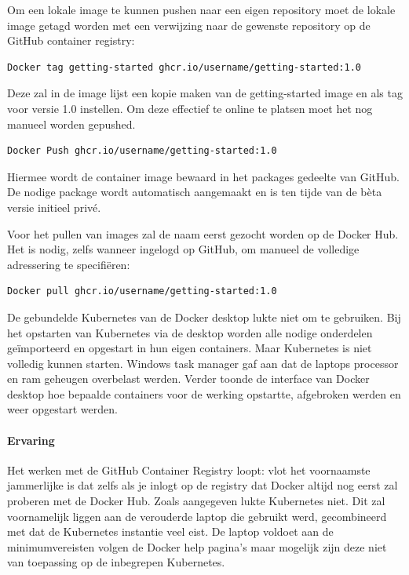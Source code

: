 Om een lokale image te kunnen pushen naar een eigen repository moet de lokale image getagd worden met een verwijzing naar de gewenste repository op de GitHub container registry:
\begin{verbatim}
Docker tag getting-started ghcr.io/username/getting-started:1.0
\end{verbatim}

Deze zal in de image lijst een kopie maken van de getting-started image en als tag voor versie 1.0 instellen. Om deze effectief te online te platsen moet het nog manueel worden gepushed.
\begin{verbatim}
Docker Push ghcr.io/username/getting-started:1.0
\end{verbatim}

Hiermee wordt de container image bewaard in het packages gedeelte van GitHub. De nodige package wordt automatisch aangemaakt en is ten tijde van de bèta versie initieel privé.

Voor het pullen van images zal de naam eerst gezocht worden op de Docker Hub. Het is nodig, zelfs wanneer ingelogd op GitHub, om manueel de volledige adressering te specifiëren:
\begin{verbatim}
Docker pull ghcr.io/username/getting-started:1.0
\end{verbatim}


De gebundelde Kubernetes van de Docker desktop lukte niet om te gebruiken. Bij het opstarten van Kubernetes via de desktop worden alle nodige onderdelen geïmporteerd en opgestart in hun eigen containers. Maar Kubernetes is niet volledig kunnen starten. Windows task manager gaf aan dat de laptops processor en ram geheugen overbelast werden. Verder toonde de interface van Docker desktop hoe bepaalde containers voor de werking opstartte, afgebroken werden en weer opgestart werden.

\paragraph{Ervaring}
Het werken met de GitHub Container Registry loopt: vlot het voornaamste jammerlijke is dat zelfs als je inlogt op de registry dat Docker altijd nog eerst zal proberen met de Docker Hub.
Zoals aangegeven lukte Kubernetes niet. Dit zal voornamelijk liggen aan de verouderde laptop die gebruikt werd, gecombineerd met dat de Kubernetes instantie veel eist. De laptop voldoet aan de minimumvereisten volgen de Docker help pagina’s maar mogelijk zijn deze niet van toepassing op de inbegrepen Kubernetes.  


